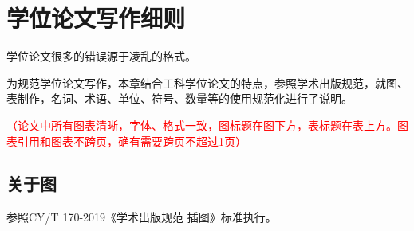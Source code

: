 \chapter{学位论文写作细则}
\label{cha:fourthsection}

学位论文很多的错误源于凌乱的格式。

为规范学位论文写作，本章结合工科学位论文的特点，参照学术出版规范，就图、表制作，名词、术语、单位、符号、数量等的使用规范化进行了说明。

\textcolor{red}{（论文中所有图表清晰，字体、格式一致，图标题在图下方，表标题在表上方。图表引用和图表不跨页，确有需要跨页不超过1页）}


\section{关于图}
\label{sec:parameters}
参照CY/T 170-2019《学术出版规范 插图》标准执行。

